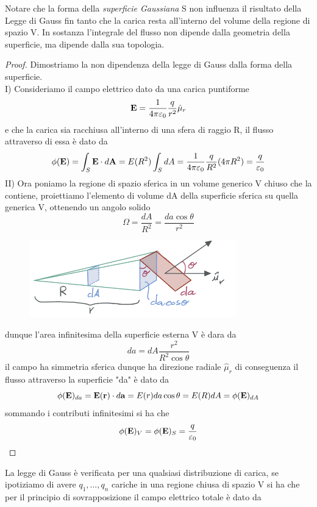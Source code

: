 \noindent Notare che la forma della \textit{superficie Gaussiana} S non influenza il risultato della Legge di Gauss fin tanto che la carica resta all'interno del volume della regione di spazio V. In sostanza l'integrale del flusso non dipende dalla geometria della superficie, ma dipende dalla sua topologia.
\begin{proof}
	Dimostriamo la non dipendenza della legge di Gauss dalla forma della superficie.
	\\
	I) Consideriamo il campo elettrico dato da una carica puntiforme 
	\begin{equation*}
		\bold{E} = \frac{1}{4 \pi \varepsilon_0} \frac{q}{r^2} \hat{\mu}_{r}
	\end{equation*}
	e che la carica sia racchiusa all'interno di una sfera di raggio R, il flusso attraverso di essa \`e dato da 
	\begin{equation*}
		\phi(\bold{E}) = \int_{S} \bold{E} \cdot d\bold{A} = E(R^2) \int_{S}dA = \frac{1}{4 \pi \varepsilon_0} \frac{q}{R^2} (4\pi R^2) = \frac{q}{\varepsilon_0}
	\end{equation*}
	II) Ora poniamo la regione di spazio sferica in un volume generico V chiuso che la contiene, proiettiamo l'elemento di volume dA della superficie sferica su quella generica V, ottenendo un angolo solido 
	\begin{equation*}
		\Omega = \frac{dA}{R^2} = \frac{da\cos\theta}{r^2}
	\end{equation*}
	 
\begin{figure}[!ht]
\vspace{0.1in}
\includegraphics[width = 9cm]{images/solid}	
\centering
\vspace{0.1in}
\end{figure} 
dunque l'area infinitesima della superficie esterna V \`e dara da 
\begin{equation*}
	da = dA\frac{r^2}{R^2 \cos \theta }
\end{equation*}
il campo ha simmetria sferica dunque ha direzione radiale $\hat{\mu}_r$ di conseguenza il flusso attraverso la superficie "da" \`e dato da 
\begin{equation*}
	\phi(\bold{E})_{da} = \bold{E}(\bold{r}) \cdot d\bold{a} = E(r)da \cos \theta = E(R)dA = \phi(\bold{E})_{dA}
\end{equation*}
sommando i contributi infinitesimi si ha che 
\begin{equation*}
	\phi(\bold{E})_{V} = \phi(\bold{E})_{S} = \frac{q}{\varepsilon_0}
\end{equation*}	
\end{proof}
\noindent La legge di Gauss \`e verificata per una qualsiasi distribuzione di carica, se ipotiziamo di avere $q_1,...,q_n$ cariche in una regione chiusa di spazio V si ha che per il principio di sovrapposizione il campo elettrico totale \`e dato da 

